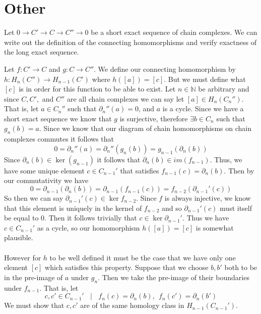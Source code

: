 \documentclass{article}
\theoremstyle{definition}
\begin{document}
\section*{Other}
    \begin{mdframed}[]
        Let $0\rightarrow C'\rightarrow C \rightarrow C'' \rightarrow 0$ be a short exact sequence of chain complexes.
        We can write out the definition of the connecting homomorphisms and verify exactness of the long exact sequence.
    \end{mdframed}
    Let $f: C' \rightarrow C$ and $g : C \rightarrow C''$. We define 
    our connecting homomorphism by $h : H_n(C'') \rightarrow H_{n-1}(C')$ where $h([a]) = [c]$.
    But we must define what $[c]$ is in order for this function to be able to exist.
    Let $n \in \mathbb{N}$ be arbitrary and since $C, C',$ and $C''$ are all chain 
    complexes we can say let $[a] \in H_n(C_n'')$. That is, let $a \in C_n''$
    such that $\partial_n''(a) = 0$, and $a$ is a cycle. Since we have 
    a short exact sequence we know that $g$ is surjective, therefore $\exists b \in C_n$
    such that $g_n(b) = a$. Since we know that our diagram of chain homomorphisms on 
    chain complexes commutes it follows that 
    \[
        0 = \partial_n''(a) = \partial_n''(g_n(b)) = g_{n-1}(\partial_n(b))
    \]
    Since $\partial_n(b) \in \ker(g_{n-1})$ it follows that $\partial_n(b) \in im(f_{n-1})$.
    Thus, we have some unique element $c \in C_{n-1}'$ that satisfies $f_{n-1}(c) = \partial_n(b)$.
    Then by our commutativity we have 
    \[
        0 = \partial_{n-1}(\partial_n(b)) = \partial_{n-1}(f_{n-1}(c)) = f_{n-2}(\partial_{n-1}'(c)) 
    \]
    So then we can say $\partial_{n-1}'(c) \in \ker f_{n-2}$. Since $f$ is always injective,
    we know that this element is uniquely in the kernel of $f_{n-2}$ and so $\partial_{n-1}'(c)$
    must itself be equal to 0. Then it follows trivially that $c \in \ker \partial_{n-1}'$.
    Thus we have $c \in C_{n-1}'$ as a cycle, so our homomorphism $h([a]) = [c]$ is somewhat plausible.
    \\\\
    However for $h$ to be well defined it must be the case that we have only one element $[c]$ which 
    satisfies this property.
    Suppose that we choose $b, b'$ both to be in the pre-image of $a$ under $g_n$.
    Then we take the pre-image of their boundaries under $f_{n-1}$. That is, let 
    \[
        c,c' \in C_{n-1}' \ \ \ \ | \ \ \ \ f_n(c) = \partial_n(b), \ \ f_n(c') = \partial_n(b')
    \]
    We must show that $c,c'$ are of the same homology class in $H_{n-1}(C_{n-1}')$.
\end{document}
